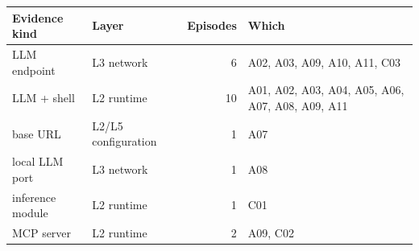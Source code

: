 \begin{tabular}{@{}l l r >{\raggedright\arraybackslash}p{5.4cm}@{}}
\toprule
Evidence kind & Layer & Episodes & Which \\
\midrule
LLM endpoint & L3 network & 6 & A02, A03, A09, A10, A11, C03 \\
LLM + shell & L2 runtime & 10 & A01, A02, A03, A04, A05, A06, A07, A08, A09, A11 \\
base URL & L2/L5 configuration & 1 & A07 \\
local LLM port & L3 network & 1 & A08 \\
inference module & L2 runtime & 1 & C01 \\
MCP server & L2 runtime & 2 & A09, C02 \\
\bottomrule
\end{tabular}
